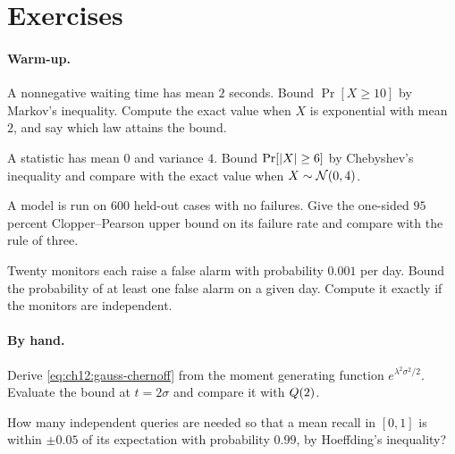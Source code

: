 \section*{Exercises}

\paragraph{Warm-up.}

\begin{exercise}\label{exr:ch12:markov}
A nonnegative waiting time has mean $2$ seconds. Bound $\Pr[X\ge10]$ by Markov's inequality. Compute the exact value when $X$ is exponential with mean $2$, and say which law attains the bound.
\end{exercise}

\begin{exercise}\label{exr:ch12:cheb}
A statistic has mean $0$ and variance $4$. Bound $\Pr[\lvert X\rvert\ge6]$ by Chebyshev's inequality and compare with the exact value when $X\sim\mathcal{N}(0,4)$.
\end{exercise}

\begin{exercise}\label{exr:ch12:rule3}
A model is run on $600$ held-out cases with no failures. Give the one-sided $95$ percent Clopper--Pearson upper bound on its failure rate and compare with the rule of three.
\end{exercise}

\begin{exercise}\label{exr:ch12:union}
Twenty monitors each raise a false alarm with probability $0.001$ per day. Bound the probability of at least one false alarm on a given day. Compute it exactly if the monitors are independent.
\end{exercise}

\paragraph{By hand.}

\begin{exercise}\label{exr:ch12:gauss}
Derive \cref{eq:ch12:gauss-chernoff} from the moment generating function $e^{\lambda^2\sigma^2/2}$. Evaluate the bound at $t=2\sigma$ and compare it with $Q(2)$.
\end{exercise}

\begin{exercise}\label{exr:ch12:hoeffn}
How many independent queries are needed so that a mean recall in $[0,1]$ is within $\pm0.05$ of its expectation with probability $0.99$, by Hoeffding's inequality?
\end{exercise}

